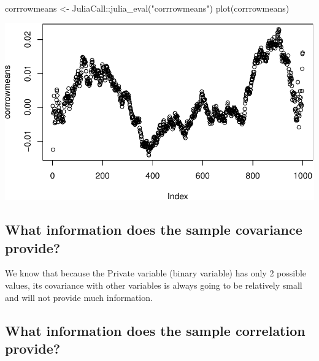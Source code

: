 \documentclass[
]{article}
\newenvironment{Shaded}{\begin{snugshade}}{\end{snugshade}}
\newcommand{\FunctionTok}[1]{\textcolor[rgb]{0.00,0.00,0.00}{#1}}
\newcommand{\NormalTok}[1]{#1}
\newcommand{\OtherTok}[1]{\textcolor[rgb]{0.56,0.35,0.01}{#1}}
\newcommand{\SpecialCharTok}[1]{\textcolor[rgb]{0.00,0.00,0.00}{#1}}
\newcommand{\StringTok}[1]{\textcolor[rgb]{0.31,0.60,0.02}{#1}}
\begin{document}
\begin{Shaded}
\begin{Highlighting}[]
\NormalTok{corrrowmeans }\OtherTok{\textless{}{-}}\NormalTok{ JuliaCall}\SpecialCharTok{::}\FunctionTok{julia\_eval}\NormalTok{(}\StringTok{"corrrowmeans"}\NormalTok{)}
\FunctionTok{plot}\NormalTok{(corrrowmeans)}
\end{Highlighting}
\end{Shaded}

\includegraphics{./figures/unnamed-chunk-12-2.pdf}

\hypertarget{what-information-does-the-sample-covariance-provide}{%
\subsection{What information does the sample covariance
provide?}\label{what-information-does-the-sample-covariance-provide}}

We know that because the Private variable (binary variable) has only 2
possible values, its covariance with other variables is always going to
be relatively small and will not provide much information.

\newpage

\hypertarget{what-information-does-the-sample-correlation-provide}{%
\subsection{What information does the sample correlation
provide?}\label{what-information-does-the-sample-correlation-provide}}
\end{document}
